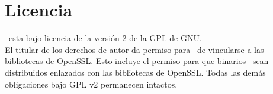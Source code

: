 \section{Licencia}

  \vsftpd\ esta bajo licencia de la versión 2 de la GPL de GNU.\\
  El titular de los derechos de autor da permiso para \vsftpd\ de vincularse a las bibliotecas de 
  OpenSSL. Esto incluye el permiso para que binarios \vsftpd\ sean distribuidos enlazados con las 
  bibliotecas de OpenSSL. Todas las dem\'as obligaciones bajo GPL v2 permanecen intactos.\\

